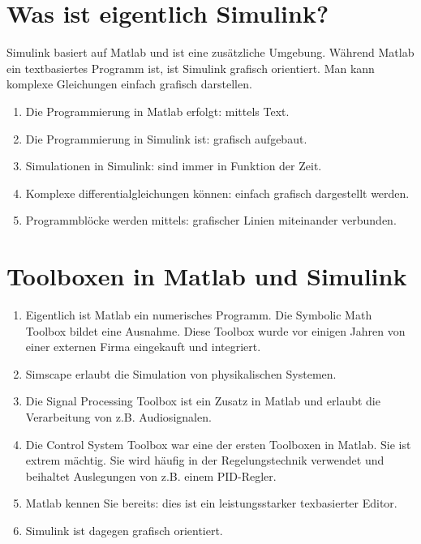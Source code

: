 \section{Was ist eigentlich Simulink?}
Simulink basiert auf Matlab und ist eine zusätzliche Umgebung. Während Matlab ein textbasiertes Programm ist, ist Simulink grafisch orientiert. Man kann komplexe Gleichungen einfach grafisch darstellen.
\begin{enumerate}
\item Die Programmierung in Matlab erfolgt: {\color{magenta}mittels Text}.
\item Die Programmierung in Simulink ist: {\color{magenta}grafisch aufgebaut}.
\item Simulationen in Simulink: {\color{magenta}sind immer in Funktion der Zeit}.
\item Komplexe differentialgleichungen können: {\color{magenta}einfach grafisch dargestellt werden}.
\item Programmblöcke werden mittels: {\color{magenta}grafischer Linien miteinander verbunden}.
\end{enumerate}
\section{Toolboxen in Matlab und Simulink}
\begin{enumerate}
\item Eigentlich ist Matlab ein numerisches Programm. Die {\color{magenta}Symbolic Math Toolbox} bildet eine Ausnahme. Diese Toolbox wurde vor einigen Jahren von einer externen Firma eingekauft und integriert.
\item {\color{magenta}Simscape} erlaubt die Simulation von physikalischen Systemen.
\item Die {\color{magenta}Signal Processing Toolbox} ist ein Zusatz in Matlab und erlaubt die Verarbeitung von z.B. Audiosignalen. 
\item Die {\color{magenta}Control System Toolbox} war eine der ersten Toolboxen in Matlab. Sie ist extrem mächtig. Sie wird häufig in der Regelungstechnik verwendet und beihaltet Auslegungen von z.B. einem PID-Regler.
\item {\color{magenta}Matlab} kennen Sie bereits: dies ist ein leistungsstarker texbasierter Editor.
\item {\color{magenta}Simulink} ist dagegen grafisch orientiert.
\end{enumerate}
